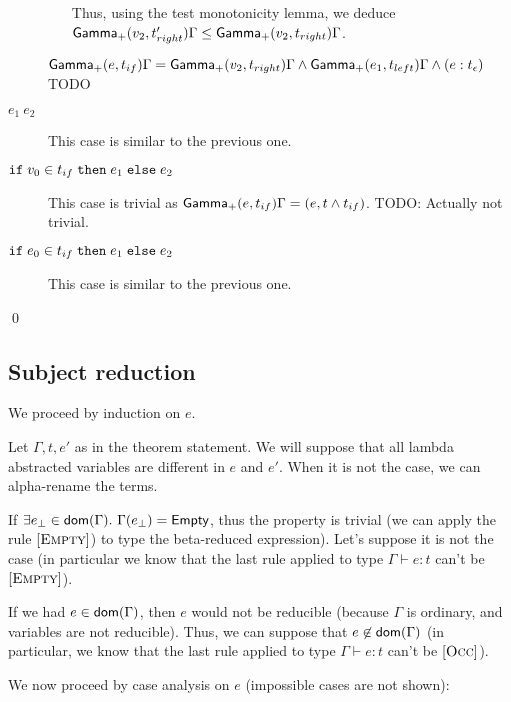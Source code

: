 \documentclass[a4paper]{article}
\theoremstyle{definition}
\begin{document}
\begin{description}
\begin{itemize}
            Thus, using the test monotonicity lemma, we deduce $\textsf{Gamma}_{+}(v_2,t_{right}') \Gamma \leq \textsf{Gamma}_{+}(v_2,t_{right}) \Gamma$.
          \end{itemize}
          
          $\textsf{Gamma}_{+}(e,t_{if}) \Gamma = \textsf{Gamma}_{+}(v_2,t_{right}) \Gamma \land \textsf{Gamma}_{+}(e_1,t_{left}) \Gamma \land (e:t_\epsilon)$ TODO
    
          \item[$e_1\ e_2$] This case is similar to the previous one.
          \item[$\texttt{if}\;v_0\in t_{if}\;\texttt{then}\;e_1\;\texttt{else}\;e_2$] This case is trivial as $\textsf{Gamma}_{+}(e,t_{if}) \Gamma = (e, t\land t_{if})$. TODO: Actually not trivial.
          \item[$\texttt{if}\;e_0\in t_{if}\;\texttt{then}\;e_1\;\texttt{else}\;e_2$] This case is similar to the previous one.
        \end{description}
    
        \qed
    
        \subsection{Subject reduction}
    
        We proceed by induction on $e$.
    
        Let $\Gamma,t,e'$ as in the theorem statement.
        We will suppose that all lambda abstracted variables are different in $e$ and $e'$. When it is not the case, we can alpha-rename the terms.
    
        If $\exists e_{\bot} \in \dom\Gamma.\ \Gamma(e_{\bot}) = \Empty$, thus the property is trivial
        (we can apply the rule $[\textsc{Empty}]$) to type the beta-reduced expression).
        Let's suppose it is not the case (in particular we know that the last rule applied to type $\Gamma \vdash e:t$ can't be $[\textsc{Empty}]$).
    
        If we had $e\in\textsf{dom}(\Gamma)$, then $e$ would not be reducible (because $\Gamma$ is ordinary, and variables are not reducible).
        Thus, we can suppose that $e\not\in\textsf{dom}(\Gamma)$ (in particular, we know that the last rule applied to type $\Gamma \vdash e:t$ can't be $[\textsc{Occ}]$).
    
        We now proceed by case analysis on $e$ (impossible cases are not shown):
    
\end{document}
